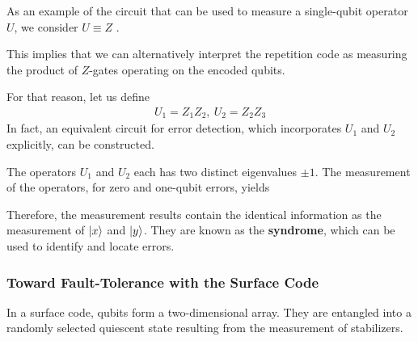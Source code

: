 As an example of the circuit that can be used to measure a single-qubit operator $U$, we consider $U \equiv Z$ . 

This implies that we can alternatively interpret the repetition code as measuring the product of $Z$-gates operating on the encoded qubits.

For that reason, let us define
\begin{align*}
    U_1=Z_1Z_2,\ U_2=Z_2Z_3
\end{align*}
In fact, an equivalent circuit for error detection, which incorporates $U_1$ and $U_2$ explicitly, can be constructed.

The operators $U_1$ and $U_2$ each has two distinct eigenvalues $\pm 1$. The measurement of the operators, for zero and one-qubit errors, yields

Therefore, the measurement results contain the identical information as the measurement of $\ket{x}$ and $\ket{y}$. They are known as the \textbf{syndrome}, which can be used to identify and locate errors.


\subsubsection{Toward Fault-Tolerance with the Surface Code}
In a surface code, qubits form a two-dimensional array. They are entangled into a randomly selected quiescent state resulting from the measurement of stabilizers.
